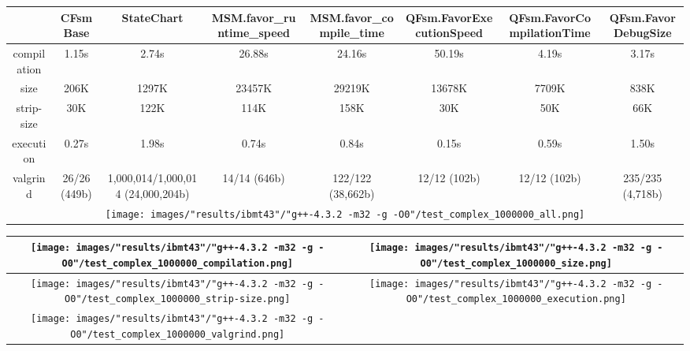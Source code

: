 \begin{landscape}
\begin{table}
\caption{"ibmt43" [df6407d], g++-4.3.2 -m32 -g -O0/test complex 1000000}
\centering
\begin{longtable}{| c | c |c |c |c |c |c |c |}
\hline
& CFsmBase& StateChart& MSM.favor\_runtime\_speed& MSM.favor\_compile\_time& QFsm.FavorExecutionSpeed& QFsm.FavorCompilationTime& QFsm.FavorDebugSize\\
\hline
compilation & 1.15s & 2.74s & 26.88s & 24.16s & 50.19s & 4.19s & 3.17s\\
\hline
size & 206K & 1297K & 23457K & 29219K & 13678K & 7709K & 838K\\
\hline
strip-size & 30K & 122K & 114K & 158K & 30K & 50K & 66K\\
\hline
execution & 0.27s & 1.98s & 0.74s & 0.84s & 0.15s & 0.59s & 1.50s\\
\hline
valgrind & 26/26 (449b) & 1,000,014/1,000,014 (24,000,204b) & 14/14 (646b) & 122/122 (38,662b) & 12/12 (102b) & 12/12 (102b) & 235/235 (4,718b)\\
\hline
\multicolumn{8}{|c|}{\texttt{[image: images/"results/ibmt43"/"g++-4.3.2 -m32 -g -O0"/test\_complex\_1000000\_all.png]}}\\
\hline
\end{longtable}
\end{table}
\end{landscape}
\newpage
\begin{table}
\centering
\begin{longtable}{| c | c |}
\hline
\texttt{[image: images/"results/ibmt43"/"g++-4.3.2 -m32 -g -O0"/test\_complex\_1000000\_compilation.png]}& \texttt{[image: images/"results/ibmt43"/"g++-4.3.2 -m32 -g -O0"/test\_complex\_1000000\_size.png]}\\
\hline
\texttt{[image: images/"results/ibmt43"/"g++-4.3.2 -m32 -g -O0"/test\_complex\_1000000\_strip-size.png]}& \texttt{[image: images/"results/ibmt43"/"g++-4.3.2 -m32 -g -O0"/test\_complex\_1000000\_execution.png]}\\
\hline
\texttt{[image: images/"results/ibmt43"/"g++-4.3.2 -m32 -g -O0"/test\_complex\_1000000\_valgrind.png]}& \\ \hline
\end{longtable}
\end{table}
